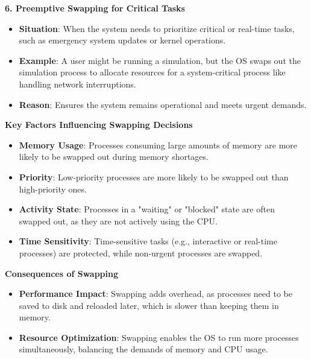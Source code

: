 \documentclass[a4paper]{book}
\begin{document}
\hrulefill

\textbf{6. Preemptive Swapping for Critical Tasks}

\begin{itemize}
\item 
\textbf{Situation}: When the system needs to prioritize critical or real-time tasks, such as emergency system updates or kernel operations.

\item 
\textbf{Example}: A user might be running a simulation, but the OS swaps out the simulation process to allocate resources for a system-critical process like handling network interruptions.

\item 
\textbf{Reason}: Ensures the system remains operational and meets urgent demands.

\end{itemize}

\hrulefill

\textbf{Key Factors Influencing Swapping Decisions}

\begin{itemize}
\item 
\textbf{Memory Usage}: Processes consuming large amounts of memory are more likely to be swapped out during memory shortages.

\item 
\textbf{Priority}: Low-priority processes are more likely to be swapped out than high-priority ones.

\item 
\textbf{Activity State}: Processes in a "waiting" or "blocked" state are often swapped out, as they are not actively using the CPU.

\item 
\textbf{Time Sensitivity}: Time-sensitive tasks (e.g., interactive or real-time processes) are protected, while non-urgent processes are swapped.

\end{itemize}

\hrulefill

\textbf{Consequences of Swapping}

\begin{itemize}
\item 
\textbf{Performance Impact}: Swapping adds overhead, as processes need to be saved to disk and reloaded later, which is slower than keeping them in memory.

\item 
\textbf{Resource Optimization}: Swapping enables the OS to run more processes simultaneously, balancing the demands of memory and CPU usage.

\end{itemize}
\end{document}

